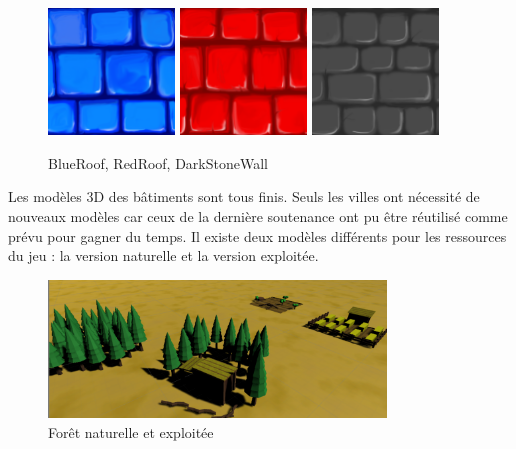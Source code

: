\documentclass[12pt]{report}
\begin{document}
\begin{figure}[H]
    \centering
    \includegraphics[width=0.3\textwidth]{BlueRoof}
    \includegraphics[width=0.3\textwidth]{RedRoof}
    \includegraphics[width=0.3\textwidth]{DarkStoneWall}
    \caption{BlueRoof, RedRoof, DarkStoneWall}
\end{figure}

Les modèles 3D des bâtiments sont tous finis. Seuls les villes ont nécessité de
nouveaux modèles car ceux de la dernière soutenance ont pu être réutilisé comme
prévu pour gagner du temps. Il existe deux modèles différents pour les
ressources du jeu : la version naturelle et la version exploitée.

\begin{figure}[H]
    \centering
    \includegraphics[width=0.8\textwidth]{assets_food_forest}
    \caption{Forêt naturelle et exploitée}
\end{figure}
\end{document}
